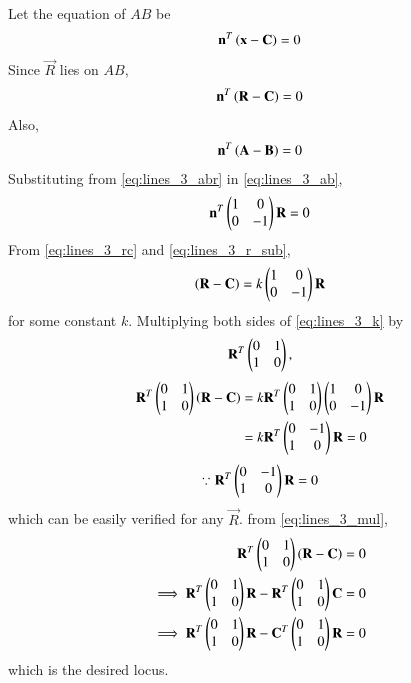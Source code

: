 \documentclass[journal,12pt,twocolumn]{IEEEtran}
\begin{document}
\begin{enumerate}[label=\arabic*]
%
Let the equation of $AB$ be 
\begin{align}
\mathbf{n}^T\left(\mathbf{x} - \mathbf{C}\right) = 0
\label{eq:lines_3_def}
\end{align}
Since $\vec{R}$ lies on $AB$, 
\begin{align}
\mathbf{n}^T\left(\mathbf{R} - \mathbf{C}\right) = 0
\label{eq:lines_3_rc}
\end{align}
Also, 
\begin{align}
\mathbf{n}^T\left(\mathbf{A} - \mathbf{B}\right) = 0
\label{eq:lines_3_ab}
\end{align}
%
Substituting from \eqref{eq:lines_3_abr} in \eqref{eq:lines_3_ab},
\begin{align}
\mathbf{n}^T\begin{pmatrix}1 & 0 \\ 0 & -1\end{pmatrix}\mathbf{R} = 0
\label{eq:lines_3_r_sub}
\end{align}
%
From \eqref{eq:lines_3_rc} and \eqref{eq:lines_3_r_sub},
\begin{align}
\left(\mathbf{R} - \mathbf{C}\right) = k\begin{pmatrix}1 & 0 \\ 0 & -1\end{pmatrix}\mathbf{R}
\label{eq:lines_3_k}
\end{align}
%
for some constant $k$.
Multiplying both sides of \eqref{eq:lines_3_k} by 
\begin{align}
\mathbf{R}^T\begin{pmatrix}0 & 1 \\ 1 & 0\end{pmatrix},
\end{align}
\begin{align}
\mathbf{R}^T\begin{pmatrix}0 & 1 \\ 1 & 0\end{pmatrix}\left(\mathbf{R} - \mathbf{C}\right) &= k\mathbf{R}^T\begin{pmatrix}0 & 1 \\ 1 & 0\end{pmatrix}\begin{pmatrix}1 & 0 \\ 0 & -1\end{pmatrix}\mathbf{R}
\nonumber \\
&= k\mathbf{R}^T\begin{pmatrix}0 & -1 \\ 1 & 0\end{pmatrix}\mathbf{R} = 0
\label{eq:lines_3_mul}
\end{align}
\begin{align}
\because \mathbf{R}^T\begin{pmatrix}0 & -1 \\ 1 & 0\end{pmatrix}\mathbf{R} = 0
\end{align}
which can be easily verified for any $\vec{R}$.
%
from \eqref{eq:lines_3_mul},
\begin{align}
\mathbf{R}^T\begin{pmatrix}0 & 1 \\ 1 & 0\end{pmatrix}\left(\mathbf{R} - \mathbf{C}\right) = 0
\nonumber \\
\implies \mathbf{R}^T\begin{pmatrix}0 & 1 \\ 1 & 0\end{pmatrix}\mathbf{R} - \mathbf{R}^T\begin{pmatrix}0 & 1 \\ 1 & 0\end{pmatrix}\mathbf{C} = 0
\nonumber \\
\implies \mathbf{R}^T\begin{pmatrix}0 & 1 \\ 1 & 0\end{pmatrix}\mathbf{R} - \mathbf{C}^T\begin{pmatrix}0 & 1 \\ 1 & 0\end{pmatrix}\mathbf{R} = 0
\end{align}
%
which is the desired locus.
\end{enumerate}
\end{document}
